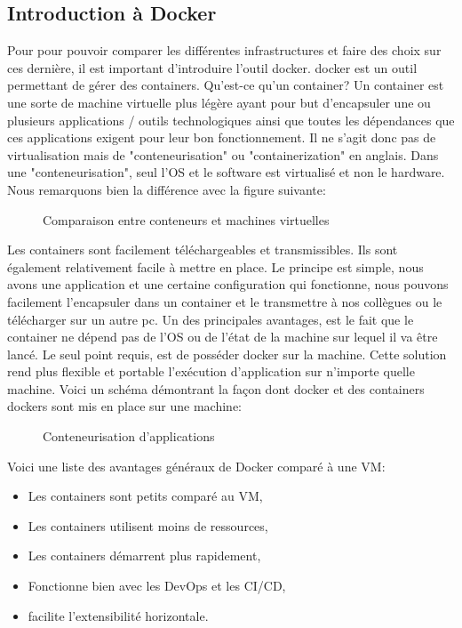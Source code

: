 \documentclass[
    iai, %
    il, %
]{heig-tb}
\begin{document}
\subsection{Introduction à Docker}
Pour pour pouvoir comparer les différentes infrastructures et faire des choix sur ces dernière, il est important d'introduire l'outil \Gls{docker}.
\Gls{docker} est un outil permettant de gérer des containers.
Qu'est-ce qu'un container? Un container est une sorte de machine virtuelle plus légère ayant pour but d'encapsuler une ou plusieurs applications / outils technologiques ainsi que toutes les dépendances que ces applications exigent pour leur bon fonctionnement.
Il ne s'agit donc pas de virtualisation mais de "conteneurisation" ou "containerization" en anglais.
Dans une "conteneurisation", seul l'OS et le software est virtualisé et non le hardware.
Nous remarquons bien la différence avec la figure suivante:
\begin{figure}
    \caption{Comparaison entre conteneurs et machines virtuelles}
\end{figure}
Les containers sont facilement téléchargeables et transmissibles. Ils sont également relativement facile à mettre en place.
Le principe est simple, nous avons une application et une certaine configuration qui fonctionne, nous pouvons facilement l'encapsuler dans un container et le transmettre à nos collègues ou le télécharger sur un autre pc.
Un des principales avantages, est le fait que le container ne dépend pas de l'OS ou de l'état de la machine sur lequel il va être lancé.
Le seul point requis, est de posséder docker sur la machine.
Cette solution rend plus flexible et portable l'exécution d'application sur n'importe quelle machine.
Voici un schéma démontrant la façon dont docker et des containers dockers sont mis en place sur une machine:
\begin{figure}
    \caption{Conteneurisation d'applications}
\end{figure}

Voici une liste des avantages généraux de Docker comparé à une VM:
\begin{itemize}
    \item Les containers sont petits comparé au VM, \cite{koukia}
    \item Les containers utilisent moins de ressources, \cite{koukia}
    \item Les containers démarrent plus rapidement, \cite{koukia}
    \item Fonctionne bien avec les DevOps et les CI/CD, \cite{koukia,data-flair_pros_cons,data-flair_use_cases}
    \item facilite l'extensibilité horizontale. \cite{data-flair_use_cases}
\end{itemize}
\end{document}
